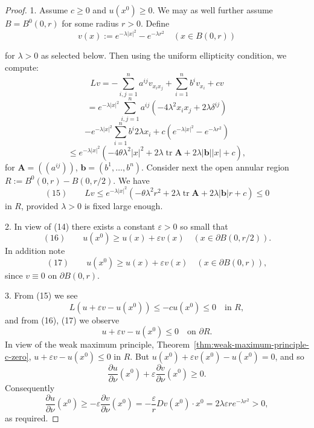 \begin{proof}
1. Assume $c \geq 0$ and $u(x^0) \geq 0$. We may as well further assume $B = B^0(0,r)$ for some radius $r > 0$. Define
$$v(x) := e^{-\lambda|x|^2} - e^{-\lambda r^2} \quad (x \in B(0,r))$$

\begin{figure}[h]\centering
\end{figure}

for $\lambda > 0$ as selected below. Then using the uniform ellipticity condition, we compute:
$$Lv = -\sum_{i,j=1}^n a^{ij}v_{x_ix_j} + \sum_{i=1}^n b^iv_{x_i} + cv$$
$$= e^{-\lambda|x|^2}\sum_{i,j=1}^n a^{ij}(-4\lambda^2x_ix_j + 2\lambda\delta^{ij})$$
$$- e^{-\lambda|x|^2}\sum_{i=1}^n b^i2\lambda x_i + c(e^{-\lambda|x|^2}-e^{-\lambda r^2})$$
$$\leq e^{-\lambda|x|^2}(-4\theta\lambda^2|x|^2 + 2\lambda\operatorname{tr}\mathbf A + 2\lambda|\mathbf b||x| + c),$$
for $\mathbf A = ((a^{ij}))$, $\mathbf b = (b^1,\ldots,b^n)$. Consider next the open annular region $R := B^0(0,r) - B(0,r/2)$. We have
$$(15) \qquad Lv \leq e^{-\lambda|x|^2}(-\theta\lambda^2r^2 + 2\lambda\operatorname{tr}\mathbf A + 2\lambda|\mathbf b|r + c) \leq 0$$
in $R$, provided $\lambda > 0$ is fixed large enough.

2. In view of (14) there exists a constant $\varepsilon > 0$ so small that
$$(16) \qquad u(x^0) \geq u(x) + \varepsilon v(x) \quad (x \in \partial B(0,r/2)).$$
In addition note
$$(17) \qquad u(x^0) \geq u(x) + \varepsilon v(x) \quad (x \in \partial B(0,r)),$$
since $v \equiv 0$ on $\partial B(0,r)$.

3. From (15) we see
$$L(u+\varepsilon v - u(x^0)) \leq -cu(x^0) \leq 0 \quad \text{in } R,$$
and from (16), (17) we observe
$$u + \varepsilon v - u(x^0) \leq 0 \quad \text{on } \partial R.$$
In view of the weak maximum principle, Theorem~\ref{thm:weak-maximum-principle-c-zero}, $u + \varepsilon v - u(x^0) \leq 0$ in $R$. But $u(x^0) + \varepsilon v(x^0) - u(x^0) = 0$, and so
$$\frac{\partial u}{\partial\nu}(x^0) + \varepsilon\frac{\partial v}{\partial\nu}(x^0) \geq 0.$$
Consequently
$$\frac{\partial u}{\partial\nu}(x^0) \geq -\varepsilon\frac{\partial v}{\partial\nu}(x^0) = -\frac\varepsilon r Dv(x^0)\cdot x^0 = 2\lambda\varepsilon re^{-\lambda r^2} > 0,$$
as required.
\end{proof}

